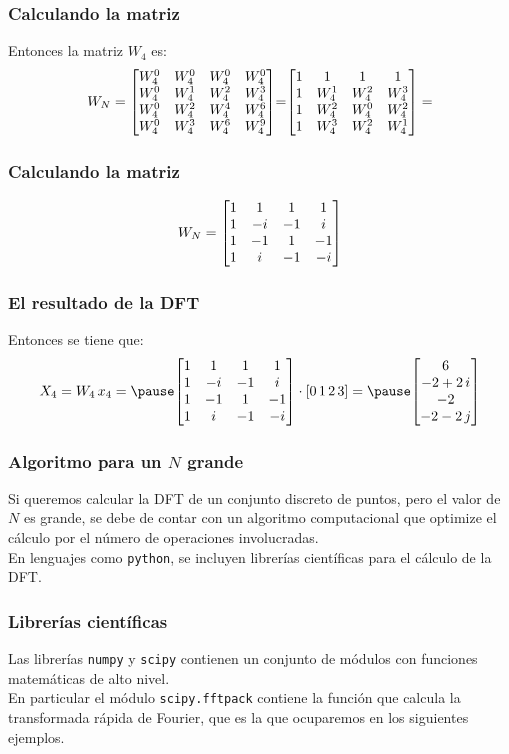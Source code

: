 \documentclass[12pt]{beamer}
\begin{document}
\begin{frame}
\frametitle{Calculando la matriz}
Entonces la matriz $W_{4}$ es:
\begin{align*}
W_{N} = \mqty[
W_{4}^{0} & W_{4}^{0} & W_{4}^{0} & W_{4}^{0} \\
W_{4}^{0} & W_{4}^{1} & W_{4}^{2} & W_{4}^{3} \\
W_{4}^{0} & W_{4}^{2} & W_{4}^{4} & W_{4}^{6} \\
W_{4}^{0} & W_{4}^{3} & W_{4}^{6} & W_{4}^{9}
 ] {=}
\mqty[
1 & 1 & 1 & 1 \\
1 & W_{4}^{1} & W_{4}^{2} & W_{4}^{3} \\
1 & W_{4}^{2} & W_{4}^{0} & W_{4}^{2} \\
1 & W_{4}^{3} & W_{4}^{2} & W_{4}^{1}
 ] =
\end{align*}
\end{frame}
\begin{frame}
\frametitle{Calculando la matriz}
\begin{align*}
W_{N} = \mqty[
1 & 1 & 1 & 1 \\
1 & -i & -1 & i \\
1 & -1 & 1 & -1 \\
1 & i & -1 & -i
 ]
\end{align*}
\end{frame}
\begin{frame}
\frametitle{El resultado de la DFT}
Entonces se tiene que:
\begin{eqnarray*}
X_{4} = W_{4} \, x_{4} = \pause
\mqty[
1 & 1 & 1 & 1 \\
1 & -i & -1 & i \\
1 & -1 & 1 & -1 \\
1 & i & -1 & -i
 ]
 \cdot [0 \, 1 \, 2 \, 3] = \pause
 \mqty[
6 \\
-2 + 2 \, i \\
-2 \\
-2 - 2 \, j
 ]
\end{eqnarray*}
\end{frame}
\begin{frame}
\frametitle{Algoritmo para un $N$ grande}
Si queremos calcular la DFT de un conjunto discreto de puntos, pero el valor de $N$ es grande, se debe de contar con un algoritmo computacional que optimize el cálculo por el número de operaciones involucradas.
\\
\bigskip
\pause
En lenguajes como \texttt{python}, se incluyen librerías científicas para el cálculo de la DFT.
\end{frame}
\begin{frame}
\frametitle{Librerías científicas}
Las librerías \texttt{numpy} y \texttt{scipy} contienen un conjunto de módulos con funciones matemáticas de alto nivel.
\\
\bigskip
\pause
En particular el módulo \texttt{scipy.fftpack} contiene la función que calcula la transformada rápida de Fourier, que es la que ocuparemos en los siguientes ejemplos.
\end{frame}
\end{document}
